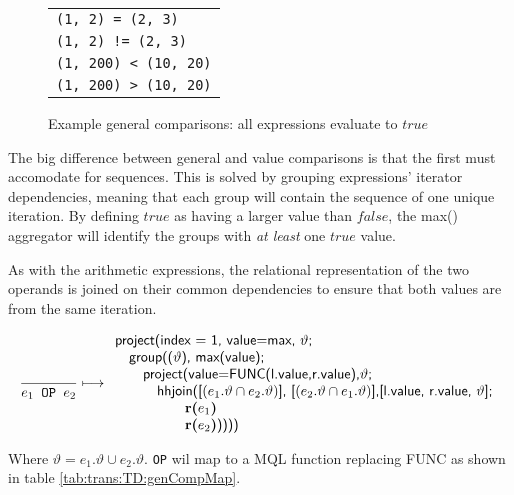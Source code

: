 \begin{figure}[h]
\centering
\begin{tabular}{l}
\texttt{(1, 2) = (2, 3)} \\
\texttt{(1, 2) != (2, 3)} \\
\texttt{(1, 200) < (10, 20)} \\
\texttt{(1, 200) > (10, 20)} \\
\end{tabular}
\label{fig:trans:TD:genCompEx}
\caption[Example general comparisons]{Example general comparisons: all expressions evaluate to $true$}
\end{figure}

The big difference between general and value comparisons is that the first must accomodate for sequences. This is
solved by grouping expressions' iterator dependencies, meaning that each group will contain the sequence of one
unique iteration. By defining $true$ as having a larger value than $false$, the \textsf{max()} aggregator will
identify the groups with \emph{at least} one $true$ value.

As with the arithmetic expressions, the relational representation of the two operands is joined on their common
dependencies to ensure that both values are from the same iteration.

\begin{equation}
\frac{}{e_1\mbox{\texttt{ OP }}e_2}\longmapsto
\begin{array}{l}
\mbox{\textsf{project(index = 1, value=max, }}\vartheta \textsf{;} \\ \quad
\mbox{\textsf{group((}}\vartheta\mbox{\textsf{), max(value);}} \\ \quad \quad
\mbox{\textsf{project(value=FUNC(l.value,r.value),}}\vartheta\mbox{\textsf{;}} \\ \quad \quad \quad
\mbox{\textsf{hhjoin([}}(e_1.\vartheta\cap e_2.\vartheta)\mbox{\textsf{], [}}(e_2.\vartheta\cap e_1.\vartheta)
\mbox{\textsf{],}} 
\mbox{\textsf{[l.value, r.value, }}\vartheta\mbox{\textsf{];}} \\ \quad \quad
\quad \quad \quad \mbox{\textbf{r(}}e_1\mbox{\textbf{)}} \\ \quad \quad \quad \quad \quad
\mbox{\textbf{r(}}e_2\mbox{\textbf{)}\textsf{))))}}
\end{array}
\label{rule:trans:TD:comparative}
\end{equation}

Where $\vartheta = e_1.\vartheta \cup e_2.\vartheta$. \texttt{OP} wil map to a MQL function replacing
\textsf{FUNC} as shown in table \ref{tab:trans:TD:genCompMap}. 

